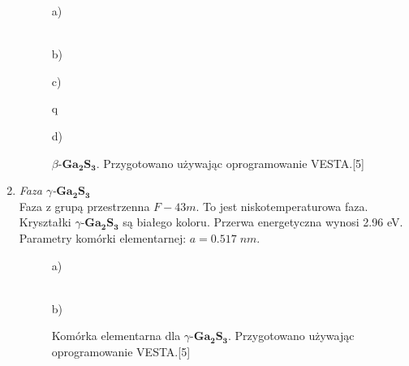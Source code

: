 \begin{enumerate}
	\begin{figure}[H]
		\begin{minipage}[h]{0.47\linewidth}
			 a) \\
		\end{minipage}
		\hfill
		\begin{minipage}[h]{0.47\linewidth}
			 \\b)
		\end{minipage}
		\vfill
		\begin{minipage}[h]{0.47\linewidth}
			 c) \\
		\end{minipage}q
		\hfill
		\begin{minipage}[h]{0.47\linewidth}
			 d) \\
		\end{minipage}
		\caption{$\beta$-$\mathbf{Ga_{2}S_{3}}$. Przygotowano używając oprogramowanie VESTA.[5]}
	\end{figure}

	\item \textit{Faza $\gamma$-$\mathbf{Ga_{2}S_{3}}$} \\
	Faza z grupą przestrzenna $F-43m$. To jest niskotemperaturowa faza. Kryształki $\gamma$-$\mathbf{Ga_{2}S_{3}}$ są białego koloru. Przerwa energetyczna wynosi 2.96 eV. Parametry komórki elementarnej: $a=0.517\;nm$.
	\begin{center}
		\begin{figure}[H]
			\begin{minipage}[h]{0.47\linewidth}
				 a) \\
			\end{minipage}
			\hfill
			\begin{minipage}[h]{0.47\linewidth}
				 \\b)
			\end{minipage}
			\caption{Komórka elementarna dla $\gamma$-$\mathbf{Ga_{2}S_{3}}$. Przygotowano używając oprogramowanie VESTA.[5]}
		\end{figure}
	\end{center}
	
\end{enumerate}

